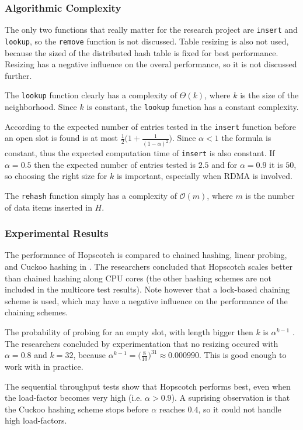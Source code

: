 \subsubsection{Algorithmic Complexity}
The only two functions that really matter for the research project are \texttt{insert} and \texttt{lookup}, so the \texttt{remove} function is not discussed. Table resizing is also not used, because the sized of the distributed hash table is fixed for best performance. Resizing has a negative influence on the overal performance, so it is not discussed further.

The \texttt{lookup} function clearly has a complexity of $\Theta(k)$, where $k$ is the size of the neighborhood. Since $k$ is constant, the \texttt{lookup} function has a constant complexity. 

According to \cite{hopscotch} the expected number of entries tested in the \texttt{insert} function before an open slot is found is at most $\frac{1}{2} \big (1 + \frac{1}{(1 - \alpha)^2} \big )$. Since $\alpha < 1$ the formula is constant, thus the expected computation time of \texttt{insert} is also constant. If $\alpha = 0.5$ then the expected number of entries tested is $2.5$ and for $\alpha = 0.9$ it is $50$, so choosing the right size for $k$ is important, especially when RDMA is involved.

The \texttt{rehash} function simply has a complexity of $\mathcal{O}(m)$, where $m$ is the number of data items inserted in $H$.

\subsubsection{Experimental Results}
The performance of Hopscotch is compared to chained hashing, linear probing, and Cuckoo hashing in \cite{hopscotch}. The researchers concluded that Hopscotch scales better than chained hashing along CPU cores (the other hashing schemes are not included in the multicore test results). Note however that a lock-based chaining scheme is used, which may have a negative influence on the performance of the chaining schemes. 

The probability of probing for an empty slot, with length bigger then $k$ is $\alpha^{k - 1}$ \cite{hopscotch}. The researchers concluded by experimentation that no resizing occured with $\alpha = 0.8$ and $k = 32$, because $\alpha^{k - 1} = \big ( \frac{8}{10} \big )^{31} \approx 0.000990$. This is good enough to work with in practice.

The sequential throughput tests show that Hopscotch performs best, even when the load-factor becomes very high (i.e. $\alpha > 0.9$). A suprising observation is that the Cuckoo hashing scheme stops before $\alpha$ reaches $0.4$, so it could not handle high load-factors. 

